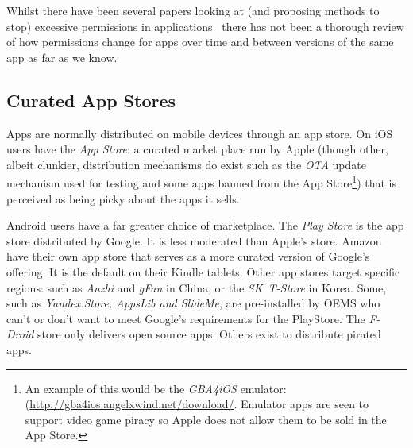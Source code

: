 \documentclass[a4paper,sfsidenotes]{%
  article%
}
\begin{document}
Whilst there have been several papers looking at (and proposing methods to stop)
excessive permissions in applications~\cite{Felt:2011kj,Vidas:2011wr} there
has not been a thorough review of how permissions change for apps over time
and between versions of the same app as far as we know. 



\subsection{Curated App Stores}

Apps are normally distributed on mobile devices through an app
store.  On iOS users have the \emph{App Store}: a curated market place run by
Apple (though other, albeit clunkier, distribution mechanisms do exist such as
the \emph{\ac{OTA}} update mechanism used for testing and some apps banned from
the App Store\footnote{An example of this would be the \emph{GBA4iOS} emulator:
(\url{http://gba4ios.angelxwind.net/download/}.  Emulator apps are seen to
support video game piracy so Apple does not allow them to be sold in the App
Store.}) that is perceived as being picky about the apps it sells.

Android users have a far greater choice of marketplace.  The \emph{Play Store}
is the app store distributed by Google. It is less moderated than Apple's store.
Amazon have their own app store that serves as a more curated version of
Google's offering. It is the default on their Kindle tablets.  Other app stores
target specific regions: such as \emph{Anzhi} and \emph{gFan} in China, or the \emph{SK~T-Store}
in Korea.  Some, such as \emph{Yandex.Store, AppsLib and SlideMe}, are
pre-installed by OEMS who can't or don't want to meet Google's requirements for
the PlayStore.  The \emph{F-Droid} store only delivers open source apps. Others
exist to distribute pirated apps. 
\end{document}
